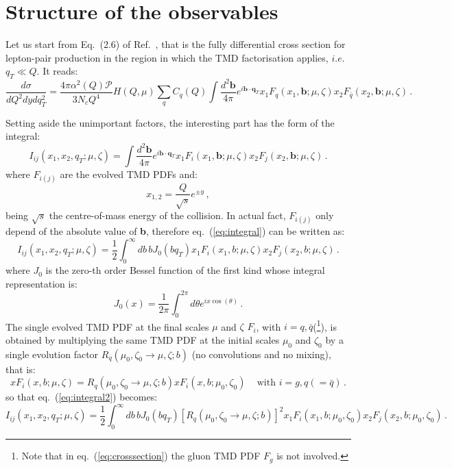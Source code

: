 \documentclass[10pt,a4paper]{article}
\begin{document}
\section{Structure of the observables}

Let us start from Eq.~(2.6) of Ref.~\cite{Scimemi:2017etj}, that is
the fully differential cross section for lepton-pair production in the
region in which the TMD factorisation applies, $i.e.$ $q_T \ll Q$. It
reads:
\begin{equation}\label{eq:crosssection}
\frac{d\sigma}{dQ^2 dy dq_T^2} =
\frac{4\pi\alpha^2(Q)\mathcal{P}}{3N_c Q^4} H(Q,\mu) \sum_q C_q(Q)
\int\frac{d^2\mathbf{b}}{4\pi} e^{i \mathbf{b}\cdot \mathbf{q}_T} x_1F_q(x_1,\mathbf{b};\mu,\zeta) x_2F_{\bar{q}}(x_2,\mathbf{b};\mu,\zeta)\,.
\end{equation}

Setting aside the unimportant factors, the interesting part has the
form of the integral:
\begin{equation}\label{eq:integral}
I_{ij}(x_1,x_2,q_T;\mu,\zeta)=\int\frac{d^2\mathbf{b}}{4\pi} e^{i \mathbf{b}\cdot \mathbf{q}_T} x_1F_i(x_1,\mathbf{b};\mu,\zeta) x_2F_{j}(x_2,\mathbf{b};\mu,\zeta)\,.
\end{equation}
where $F_{i(j)}$ are the evolved TMD PDFs and:
\begin{equation}
x_{1,2} = \frac{Q}{\sqrt{s}}e^{\pm y}\,,
\end{equation}
being $\sqrt{s}$ the centre-of-mass energy of the collision. In
actual fact, $F_{i(j)}$ only depend of the absolute value of
\textbf{b}, therefore eq.~(\ref{eq:integral}) can be written as:
\begin{equation}\label{eq:integral2}
I_{ij}(x_1,x_2,q_T;\mu,\zeta)=\frac12\int_0^\infty db\,b J_0(bq_T)  x_1
F_i(x_1,b;\mu,\zeta) x_2 F_{j}(x_2,b;\mu,\zeta)\,.
\end{equation}
where $J_0$ is the zero-th order Bessel function of the first kind
whose integral representation is:
\begin{equation}
J_0(x) = \frac1{2\pi}\int_0^{2\pi} d\theta e^{ix\cos(\theta)}\,.
\end{equation}
The single evolved TMD PDF at the final scales $\mu$ and $\zeta$
$F_i$, with $i=q,\bar{q}$(\footnote{Note that in
  eq.~(\ref{eq:crosssection}) the gluon TMD PDF $F_g$ is not
  involved.}), is obtained by multiplying the same TMD PDF at the
initial scales $\mu_0$ and $\zeta_0$ by a single evolution factor
$R_q(\mu_0,\zeta_0\rightarrow \mu,\zeta;b)$ (no convolutions and no
mixing), that is:
\begin{equation}
xF_i(x,b;\mu,\zeta) = R_q(\mu_0,\zeta_0\rightarrow \mu,\zeta;b)
xF_i(x,b;\mu_0,\zeta_0)\,\quad\mbox{with }i = g,q(=\bar{q})\,.
\end{equation}
so that eq.~(\ref{eq:integral2}) becomes:
\begin{equation}\label{eq:integral3}
I_{ij}(x_1,x_2,q_T;\mu,\zeta)=\frac12\int_0^\infty db\,b J_0(bq_T)
\left[R_q(\mu_0,\zeta_0\rightarrow \mu,\zeta;b)\right]^2 x_1 F_i(x_1,b;\mu_0,\zeta_0) x_2F_{j}(x_2,b;\mu_0,\zeta_0)\,.
\end{equation}
\end{document}
